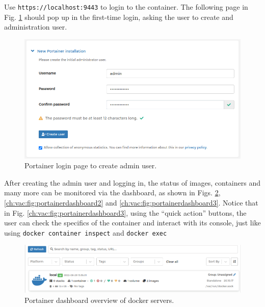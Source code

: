 Use \verb|https://localhost:9443| to login to the container. The following page in Fig. \ref{ch:vac:fig:portainerlogin} should pop up in the first-time login, asking the user to create and administration user.
\begin{figure}[htbp]
	\centering
	\includegraphics[width=350pt]{chapters/part-3/figures/portainerlogin.png}
	\caption{Portainer login page to create admin user.} \label{ch:vac:fig:portainerlogin}
\end{figure}

After creating the admin user and logging in, the status of images, containers and many more can be monitored via the dashboard, as shown in Figs. \ref{ch:vac:fig:portainerdashboard1}, \ref{ch:vac:fig:portainerdashboard2} and \ref{ch:vac:fig:portainerdashboard3}. Notice that in Fig. \ref{ch:vac:fig:portainerdashboard3}, using the ``quick action'' buttons, the user can check the specifics of the container and interact with its console, just like using \verb|docker container inspect| and \verb|docker exec|
\begin{figure}[htbp]
	\centering
	\includegraphics[width=350pt]{chapters/part-3/figures/portainerdashboard1.png}
	\caption{Portainer dashboard overview of docker servers.} \label{ch:vac:fig:portainerdashboard1}
\end{figure}

